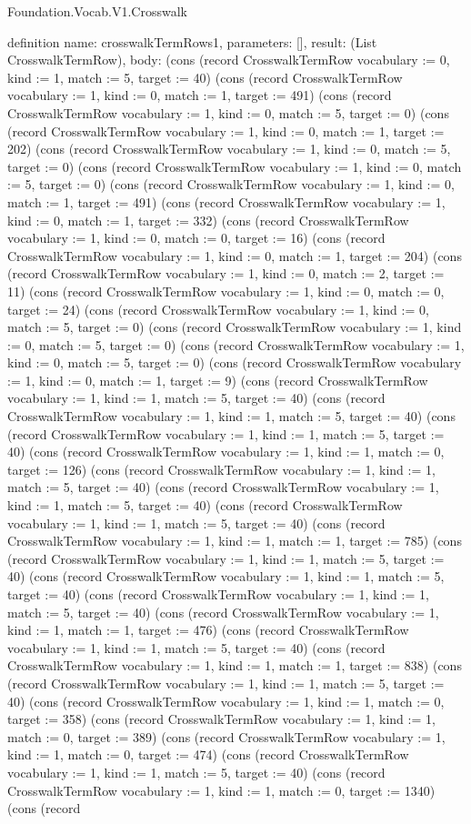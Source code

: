 \begin{lexlean}{Foundation.Vocab.V1.Crosswalk}
\begin{semanticmodule}
definition{
  name: crosswalkTermRows1,
  parameters: [],
  result: (List CrosswalkTermRow),
  body: (cons (record CrosswalkTermRow {vocabulary := 0, kind := 1, match := 5, target := 40}) (cons (record CrosswalkTermRow {vocabulary := 1, kind := 0, match := 1, target := 491}) (cons (record CrosswalkTermRow {vocabulary := 1, kind := 0, match := 5, target := 0}) (cons (record CrosswalkTermRow {vocabulary := 1, kind := 0, match := 1, target := 202}) (cons (record CrosswalkTermRow {vocabulary := 1, kind := 0, match := 5, target := 0}) (cons (record CrosswalkTermRow {vocabulary := 1, kind := 0, match := 5, target := 0}) (cons (record CrosswalkTermRow {vocabulary := 1, kind := 0, match := 1, target := 491}) (cons (record CrosswalkTermRow {vocabulary := 1, kind := 0, match := 1, target := 332}) (cons (record CrosswalkTermRow {vocabulary := 1, kind := 0, match := 0, target := 16}) (cons (record CrosswalkTermRow {vocabulary := 1, kind := 0, match := 1, target := 204}) (cons (record CrosswalkTermRow {vocabulary := 1, kind := 0, match := 2, target := 11}) (cons (record CrosswalkTermRow {vocabulary := 1, kind := 0, match := 0, target := 24}) (cons (record CrosswalkTermRow {vocabulary := 1, kind := 0, match := 5, target := 0}) (cons (record CrosswalkTermRow {vocabulary := 1, kind := 0, match := 5, target := 0}) (cons (record CrosswalkTermRow {vocabulary := 1, kind := 0, match := 5, target := 0}) (cons (record CrosswalkTermRow {vocabulary := 1, kind := 0, match := 1, target := 9}) (cons (record CrosswalkTermRow {vocabulary := 1, kind := 1, match := 5, target := 40}) (cons (record CrosswalkTermRow {vocabulary := 1, kind := 1, match := 5, target := 40}) (cons (record CrosswalkTermRow {vocabulary := 1, kind := 1, match := 5, target := 40}) (cons (record CrosswalkTermRow {vocabulary := 1, kind := 1, match := 0, target := 126}) (cons (record CrosswalkTermRow {vocabulary := 1, kind := 1, match := 5, target := 40}) (cons (record CrosswalkTermRow {vocabulary := 1, kind := 1, match := 5, target := 40}) (cons (record CrosswalkTermRow {vocabulary := 1, kind := 1, match := 5, target := 40}) (cons (record CrosswalkTermRow {vocabulary := 1, kind := 1, match := 1, target := 785}) (cons (record CrosswalkTermRow {vocabulary := 1, kind := 1, match := 5, target := 40}) (cons (record CrosswalkTermRow {vocabulary := 1, kind := 1, match := 5, target := 40}) (cons (record CrosswalkTermRow {vocabulary := 1, kind := 1, match := 5, target := 40}) (cons (record CrosswalkTermRow {vocabulary := 1, kind := 1, match := 1, target := 476}) (cons (record CrosswalkTermRow {vocabulary := 1, kind := 1, match := 5, target := 40}) (cons (record CrosswalkTermRow {vocabulary := 1, kind := 1, match := 1, target := 838}) (cons (record CrosswalkTermRow {vocabulary := 1, kind := 1, match := 5, target := 40}) (cons (record CrosswalkTermRow {vocabulary := 1, kind := 1, match := 0, target := 358}) (cons (record CrosswalkTermRow {vocabulary := 1, kind := 1, match := 0, target := 389}) (cons (record CrosswalkTermRow {vocabulary := 1, kind := 1, match := 0, target := 474}) (cons (record CrosswalkTermRow {vocabulary := 1, kind := 1, match := 5, target := 40}) (cons (record CrosswalkTermRow {vocabulary := 1, kind := 1, match := 0, target := 1340}) (cons (record }
\end{semanticmodule}
\end{lexlean}
